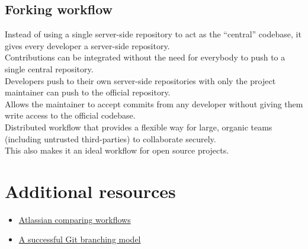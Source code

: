 




\subsection{Forking workflow}

Instead of using a single server-side repository to act as the “central” codebase, it gives every developer a server-side repository.
\\

Contributions can be integrated without the need for everybody to push to a single central repository.
\\

Developers push to their own server-side repositories with only the project maintainer can push to the official repository.
\\

Allows the maintainer to accept commits from any developer without giving them write access to the official codebase.
\\

Distributed workflow that provides a flexible way for large, organic teams (including untrusted third-parties) to collaborate securely.
\\

This also makes it an ideal workflow for open source projects.



\section{Additional resources}

\begin{itemize}[leftmargin=*]
    \item \href{https://www.atlassian.com/git/tutorials/comparing-workflows}{Atlassian comparing workflows}
	\item \href{https://nvie.com/posts/a-successful-git-branching-model/}{A successful Git branching model}
\end{itemize}

